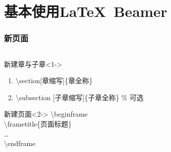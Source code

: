 \section[基本使用]{基本使用\LaTeX \, Beamer}
\begin{frame}
    \frametitle{新页面}
    \begin{columns}
        \begin{column}{0.94\textwidth}
            \begin{block}{新建章与子章}<1->
                \begin{enumerate}
                    \item \textbackslash section[章缩写]\{章全称\}\\
                    \item \textbackslash subsection [子章缩写]\{子章全称\} \% 可选
                \end{enumerate}
            \end{block}
            \begin{block}{新建页面}<2->
                \textbackslash begin{frame}\\
                \textbackslash frametitle\{页面标题\}\\ \dots \\
                \textbackslash end{frame}
            \end{block}
        \end{column}
        \begin{column}{0.06\textwidth}
        \end{column}
    \end{columns}
\end{frame}

